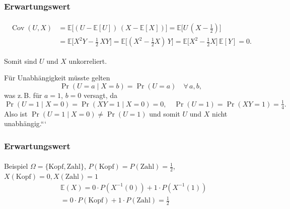 \documentclass{beamer}
\begin{document}
\begin{frame}
    \frametitle{Erwartungswert}
\framesubtitle{}


          \begin{align}
            \operatorname{Cov}(U,X)
            &= \mathbb{E}\bigl[(U - \mathbb{E}[U])\,(X - \mathbb{E}[X])\bigr]
             = \mathbb{E}\bigl[U\,(X - \tfrac12)\bigr] \\[6pt]
            &= \mathbb{E}\bigl[X^2 Y - \tfrac12\,X Y\bigr]
             = \mathbb{E}\bigl[(X^2 - \tfrac12 X)\,Y\bigr]
             = \mathbb{E}\bigl[X^2 - \tfrac12 X\bigr]\,\mathbb{E}[Y]
             = 0.
          \end{align}
          
          Somit sind $U$ und $X$ unkorreliert.
          
          
          Für Unabhängigkeit müsste gelten
          \[
            \Pr(U=a \mid X=b) = \Pr(U=a)
            \quad\forall\,a,b,
          \]
          was z.\,B. für $a=1$, $b=0$ versagt, da
          \[
            \Pr(U=1\mid X=0)
            = \Pr(XY=1\mid X=0)
            = 0,
            \quad
            \Pr(U=1)
            = \Pr(XY=1)
            = \tfrac14.
          \]
          Also ist $\Pr(U=1\mid X=0)\neq\Pr(U=1)$ und somit $U$ und $X$ nicht unabhängig.```
          
\end{frame}
 


\begin{frame}
    \frametitle{Erwartungswert}
\framesubtitle{}
\begin{block}{Beispiel}
$\Omega = \{ \text{Kopf},\text{Zahl}\}$, $P(\text{Kopf}) = P(\text{Zahl}) = \frac{1}{2}$, $X(\text{Kopf}) = 0,  X(\text{Zahl}) = 1$ 
\begin{align*}
& \mathbb{E}(X)  = 0 \cdot P(X^{-1}(0) ) + 1 \cdot P(X^{-1}(1)) \\
& =0  \cdot P(\text{Kopf}) + 1 \cdot P(\text{Zahl}) = \frac{1}{2}  
\end{align*}
\end{block}
 \end{frame}
\end{document}
